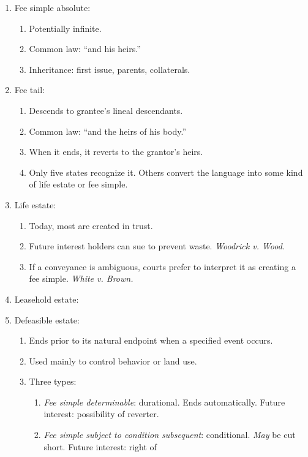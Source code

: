 \begin{enumerate}
    \item Fee simple absolute:
    \begin{enumerate}
        \item Potentially infinite.
        \item Common law: ``and his heirs.''
        \item Inheritance: first issue, parents, collaterals.
    \end{enumerate}
    \item Fee tail:
    \begin{enumerate}
        \item Descends to grantee's lineal descendants.
        \item Common law: ``and the heirs of his body.''
        \item When it ends, it reverts to the grantor's heirs.
        \item Only five states recognize it. Others convert the language into 
        some kind of life estate or fee simple.
    \end{enumerate}
    \item Life estate:
    \begin{enumerate}
        \item Today, most are created in trust.
        \item Future interest holders can sue to prevent waste.  
        \emph{Woodrick v. Wood.}
        \item If a conveyance is ambiguous, courts prefer to interpret it as 
        creating a fee simple. \emph{White v. Brown.}
    \end{enumerate}
    \item Leasehold estate:
    \item Defeasible estate:
    \begin{enumerate}
        \item Ends prior to its natural endpoint when a specified event 
        occurs.
        \item Used mainly to control behavior or land use.
        \item Three types:
        \begin{enumerate}
            \item \emph{Fee simple determinable}: durational. Ends 
            automatically. Future interest: possibility of reverter.
            \item \emph{Fee simple subject to condition subsequent}: 
            conditional. \emph{May} be cut short. Future interest: right of 

\end{enumerate}
\end{enumerate}
\end{enumerate}
